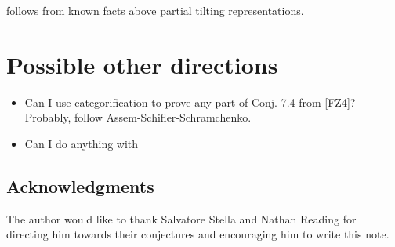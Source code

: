 \documentclass{amsart}
\begin{document}
  \cite[Conj. 3.22]{reading-speyer} follows from known facts above partial tilting representations.


  \section{Possible other directions}
  \begin{itemize}
    \item Can I use categorification to prove any part of Conj. 7.4 from [FZ4]?  Probably, follow Assem-Schifler-Schramchenko.
    \item Can I do anything with \cite[Conj. 3.9]{reading-speyer}
  \end{itemize}

  \subsection*{Acknowledgments}
  The author would like to thank Salvatore Stella and Nathan Reading for directing him towards their conjectures and encouraging him to write this note. 
\end{document}
